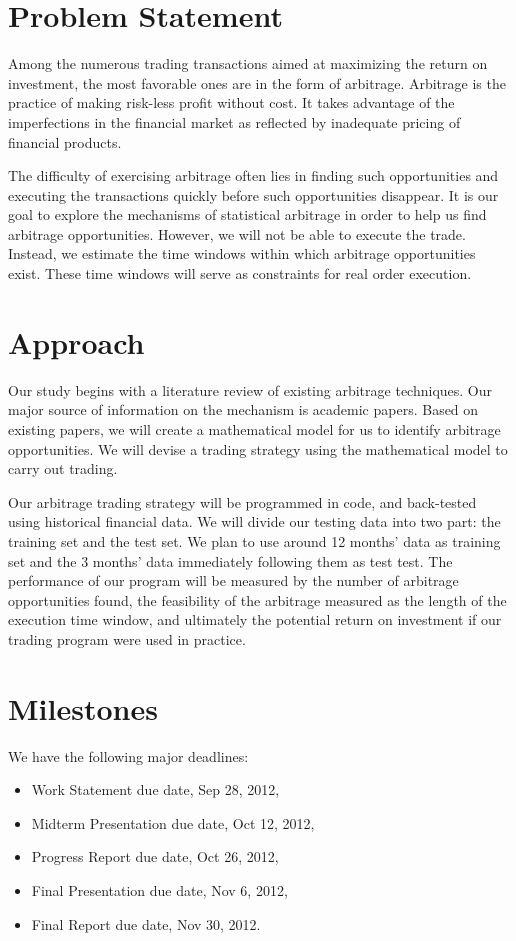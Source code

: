 \documentclass[12pt,letterpaper]{article}
\theoremstyle{definition}
\begin{document}
\section{Problem Statement}

Among the numerous trading transactions aimed at maximizing the return
on investment, the most favorable ones are in the form of
arbitrage. Arbitrage is the practice of making risk-less profit
without cost. It takes advantage of the imperfections in the financial
market as reflected by inadequate pricing of financial products.


The difficulty of exercising arbitrage often lies in finding such
opportunities and executing the transactions quickly before such
opportunities disappear. It is our goal to explore the mechanisms of
statistical arbitrage in order to help us find arbitrage
opportunities. However, we will not be able to execute the
trade. Instead, we estimate the time windows within which arbitrage
opportunities exist. These time windows will serve as constraints for
real order execution.






\section{Approach}

Our study begins with a literature review of existing arbitrage
techniques. Our major source of information on the mechanism is
academic papers. Based on existing papers, we will create a
mathematical model for us to identify arbitrage opportunities. We will
devise a trading strategy using the mathematical model to carry out
trading.


Our arbitrage trading strategy will be programmed in code, and
back-tested using historical financial data. We will divide our
testing data into two part: the training set and the test set. We plan
to use around 12 months' data as training set and the 3 months' data
immediately following them as test test. The performance of our
program will be measured by the number of arbitrage opportunities
found, the feasibility of the arbitrage measured as the length of the
execution time window, and ultimately the potential return on
investment if our trading program were used in practice.




\section{Milestones}
We have the following major deadlines:
\begin{itemize}
    \item Work Statement due date, Sep 28, 2012,
    \item Midterm Presentation due date, Oct 12, 2012,
    \item Progress Report due date, Oct 26, 2012,
    \item Final Presentation due date, Nov 6, 2012,
    \item Final Report due date, Nov 30, 2012.
\end{itemize}
\end{document}
